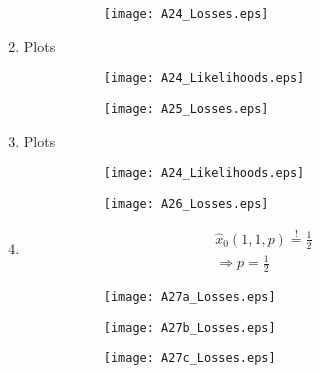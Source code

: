 \documentclass[DIN, pagenumber=false, fontsize=11pt, parskip=half]{scrartcl}
\begin{document}
\begin{enumerate}
\begin{figure}[H]
\begin{subfigure}[t]{0.49\textwidth}
            \end{subfigure}
            \begin{subfigure}[t]{0.49\textwidth}
                \centering
                \texttt{[image: A24\_Losses.eps]}
            \end{subfigure}
        \end{figure}
        \item
        Plots
        \begin{figure}[H]
            \centering
            \begin{subfigure}[t]{0.49\textwidth}
                \centering
                \texttt{[image: A24\_Likelihoods.eps]}
            \end{subfigure}
            \begin{subfigure}[t]{0.49\textwidth}
                \centering
                \texttt{[image: A25\_Losses.eps]}
            \end{subfigure}
        \end{figure}
        \item
        Plots
        \begin{figure}[H]
            \centering
            \begin{subfigure}[t]{0.49\textwidth}
                \centering
                \texttt{[image: A24\_Likelihoods.eps]}
            \end{subfigure}
            \begin{subfigure}[t]{0.49\textwidth}
                \centering
                \texttt{[image: A26\_Losses.eps]}
            \end{subfigure}
        \end{figure}
        \item
        \begin{align*}
            \widehat{x}_0(1, 1, p) \stackrel{!}{=} \frac{1}{2} \\
            \Rightarrow p = \frac{1}{2}
        \end{align*}
        \begin{figure}[H]
            \centering
            \begin{subfigure}[t]{0.49\textwidth}
                \centering
                \texttt{[image: A27a\_Losses.eps]}
                \subcaption{}
            \end{subfigure}
            \begin{subfigure}[t]{0.49\textwidth}
                \centering
                \texttt{[image: A27b\_Losses.eps]}
                \subcaption{}
            \end{subfigure}
            \begin{subfigure}[t]{0.49\textwidth}
                \centering
                \texttt{[image: A27c\_Losses.eps]}
                \subcaption{}
            \end{subfigure}
        \end{figure}
    \end{enumerate}
\end{document}
